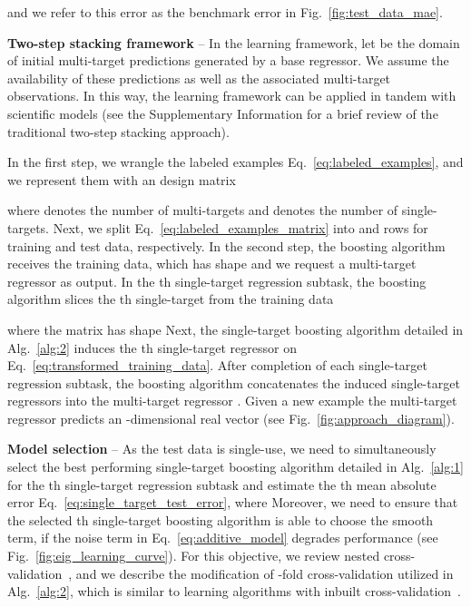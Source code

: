 \documentclass[aps,twocolumn,superscriptaddress,floatfix,preprintnumbers,showkeys]{revtex4}
\begin{document}
and we refer to this error as the benchmark error in Fig.~\ref{fig:test_data_mae}.

\textbf{Two-step stacking framework} -- In the learning framework, let  be the domain of initial multi-target predictions generated by a base regressor. We assume the availability of these predictions as well as the associated multi-target observations. In this way, the learning framework can be applied in tandem with scientific models (see the Supplementary Information for a brief review of the traditional two-step stacking approach). 

In the first step, we wrangle the labeled examples Eq.~\ref{eq:labeled_examples}, and we represent them with an  design matrix

where  denotes the number of multi-targets and  denotes the number of single-targets. Next, we split Eq.~\ref{eq:labeled_examples_matrix} into  and  rows for training and test data, respectively. In the second step, the boosting algorithm receives the training data, which has shape  and we request a multi-target regressor as output. In the th single-target regression subtask, the boosting algorithm slices the th single-target from the training data

where the matrix has shape  Next, the single-target boosting algorithm detailed in Alg.~\ref{alg:2} induces the th single-target regressor  on Eq.~\ref{eq:transformed_training_data}. After completion of each single-target regression subtask, the boosting algorithm concatenates the induced single-target regressors into the multi-target regressor
. Given a new example  the multi-target regressor predicts an -dimensional real vector  (see Fig.~\ref{fig:approach_diagram}).

\textbf{Model selection} -- As the test data is single-use, we need to simultaneously select the best performing single-target boosting algorithm detailed in Alg.~\ref{alg:1} for the th single-target regression subtask and estimate the th mean absolute error Eq.~\ref{eq:single_target_test_error}, where  Moreover, we need to ensure that the selected th single-target boosting algorithm is able to choose the smooth term, if the noise term in Eq.~\ref{eq:additive_model} degrades performance (see Fig.\ \ref{fig:eig_learning_curve}). For this objective, we review nested cross-validation~\cite{Hastie_2009, Cawley_2010, Sklearn_2011}, and we describe the modification of -fold cross-validation utilized in Alg.~\ref{alg:2}, which is similar to learning algorithms with inbuilt cross-validation~\cite{Sklearn_2011}. 
\end{document}
